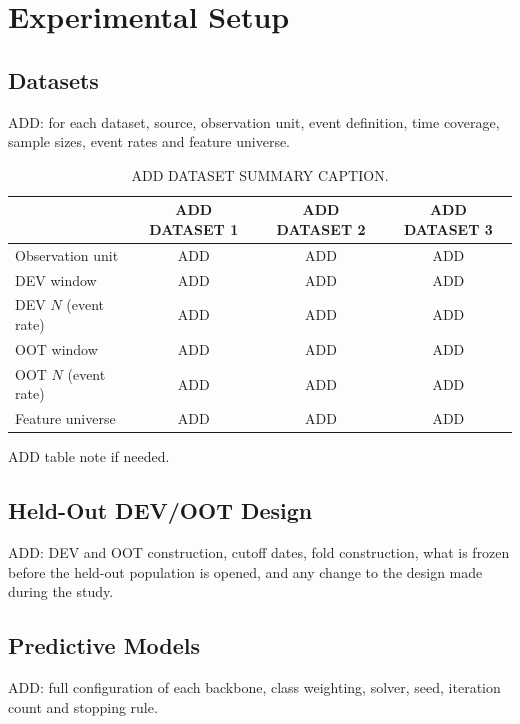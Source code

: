 \documentclass[final,5p,twocolumn]{elsarticle}
\begin{document}

\section{Experimental Setup}
\label{sec:experimental_setup}

\subsection{Datasets}
\label{subsec:datasets}
ADD: for each dataset, source, observation unit, event definition, time coverage, sample sizes, event rates and feature universe.

\begin{table}[htbp]
\centering
\footnotesize
\begin{threeparttable}
\caption{ADD DATASET SUMMARY CAPTION.}
\label{tab:datasets}
\begin{tabular}{@{}lccc@{}}
\toprule
 & ADD DATASET 1 & ADD DATASET 2 & ADD DATASET 3 \\
\midrule
Observation unit & ADD & ADD & ADD \\
DEV window & ADD & ADD & ADD \\
DEV $N$ (event rate) & ADD & ADD & ADD \\
OOT window & ADD & ADD & ADD \\
OOT $N$ (event rate) & ADD & ADD & ADD \\
Feature universe & ADD & ADD & ADD \\
\bottomrule
\end{tabular}
\begin{tablenotes}\footnotesize
\item ADD table note if needed.
\end{tablenotes}
\end{threeparttable}
\end{table}

\subsection{Held-Out DEV/OOT Design}
\label{subsec:dev_oot}
ADD: DEV and OOT construction, cutoff dates, fold construction, what is frozen before the held-out population is opened, and any change to the design made during the study.

\subsection{Predictive Models}
\label{subsec:models}
ADD: full configuration of each backbone, class weighting, solver, seed, iteration count and stopping rule.
\end{document}
